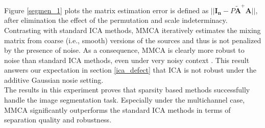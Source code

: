 Figure \ref{segmen_1} plots the matrix estimation error is defined as $||\mathbf{I_n} - P\tilde{\mathbf{A}}^{+}\mathbf{A} ||$, after elimination the effect of the permutation and scale indeterminacy. Contrasting with standard ICA methods, MMCA iteratively estimates the mixing matrix from coarse (i.e., smooth) versions of the sources and thus is not penalized by the presence of noise. As a consequence, MMCA is clearly more robust to noise than standard ICA methods, even under very noisy context \cite{BobinJ_2006Mdas}. This result answers our expectation in section \ref{ica_defect} that ICA is not robust under the additive Gaussian nosie setting.\\

The results in this experiment proves that sparsity based methods successfully handle the image segmentation task. Especially under the multichannel case, MMCA significantly outperforms the standard ICA methods in terms of separation quality and robustness.\\




